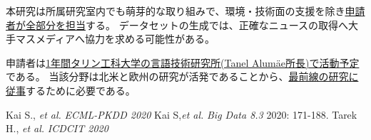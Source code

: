 
本研究は所属研究室内でも萌芽的な取り組みで、環境・技術面の支援を除き\underline{申請者が全部分を担当}する。
データセットの生成では、正確なニュースの取得へ大手マスメディアへ協力を求める可能性がある。

申請者は\underline{1年間タリン工科大学の言語技術研究所(Tanel Alumäe所長)で活動予定}である。
当該分野は北米と欧州の研究が活発であることから、\underline{最前線の研究に従事}するために必要である。

\vspace{1cm}
{\footnotesize 
\begin{twobibliography}{99}
    \setlength{\parskip}{0cm}
    \setlength{\itemsep}{0cm}
     Kai S., \textit{et al.} \textit{ECML-PKDD 2020}
     Kai S,\textit{et al.} \textit{Big Data 8.3} 2020: 171-188.
     Tarek H., \textit{et al.} \textit{ICDCIT 2020}
\end{twobibliography}
}


